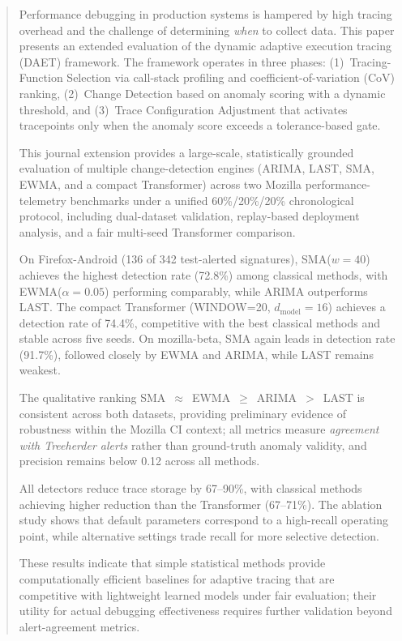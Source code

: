 \documentclass[a4paper,fleqn]{cas-sc}
\theoremstyle{plain}
\begin{document}
\begin{abstract}
Performance debugging in production systems is hampered by high tracing overhead
and the challenge of determining \emph{when} to collect data.
This paper presents an extended evaluation of the dynamic adaptive execution
tracing (DAET) framework.
The framework operates in three phases:
(1)~Tracing-Function Selection via call-stack profiling and
coefficient-of-variation (CoV) ranking,
(2)~Change Detection based on anomaly scoring with a dynamic threshold, and
(3)~Trace Configuration Adjustment that activates tracepoints only when the
anomaly score exceeds a tolerance-based gate.

This journal extension provides a large-scale, statistically grounded evaluation
of multiple change-detection engines (ARIMA, LAST, SMA, EWMA, and a compact
Transformer) across two Mozilla performance-telemetry benchmarks under a unified
60\%/20\%/20\% chronological protocol, including dual-dataset validation,
replay-based deployment analysis, and a fair multi-seed Transformer comparison.

On Firefox-Android (136 of 342 test-alerted signatures),
SMA($w=40$) achieves the highest detection rate (72.8\%)
among classical methods, with EWMA($\alpha=0.05$) performing comparably,
while ARIMA outperforms LAST.
The compact Transformer (WINDOW=20, $d_{\text{model}}=16$) achieves
a detection rate of 74.4\%, competitive with the best classical methods
and stable across five seeds.
On mozilla-beta, SMA again leads in detection rate (91.7\%), followed closely by EWMA and ARIMA,
while LAST remains weakest.

The qualitative ranking SMA~$\approx$~EWMA~$\geq$~ARIMA~$>$~LAST
is consistent across both datasets, providing preliminary evidence of
robustness within the Mozilla CI context; all metrics measure
\emph{agreement with Treeherder alerts} rather than ground-truth anomaly
validity, and precision remains below 0.12 across all methods.

All detectors reduce trace storage by 67--90\%, with classical methods achieving
higher reduction than the Transformer (67--71\%).
The ablation study shows that default parameters correspond to a high-recall
operating point, while alternative settings trade recall for more selective
detection.

These results indicate that simple statistical methods provide computationally
efficient baselines for adaptive tracing that are competitive with lightweight
learned models under fair evaluation; their utility for actual debugging
effectiveness requires further validation beyond alert-agreement metrics.
\end{abstract}
\end{document}
